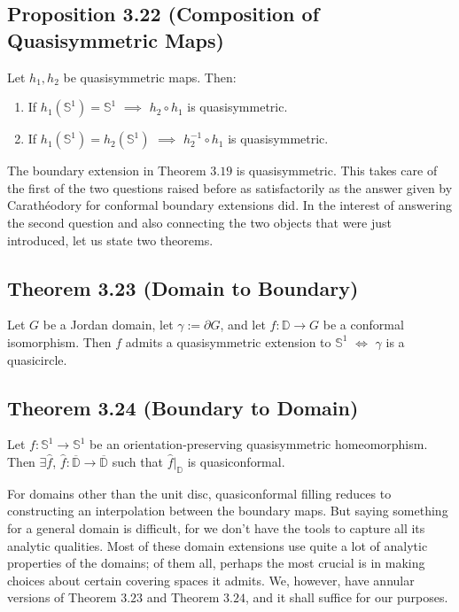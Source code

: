 \documentclass[11pt,a4paper]{article}
\begin{document}


        \subsection*{Proposition 3.22 (Composition of Quasisymmetric Maps)} Let $h_1, h_2$ be quasisymmetric maps. Then:
        \begin{enumerate}
            \item If $h_1(\mathbb{S}^1) = \mathbb{S}^1$ $\implies$ $h_2 \circ h_1$ is quasisymmetric.
            \item If $h_1(\mathbb{S}^1) = h_2(\mathbb{S}^1)$ $\implies$ $h_2^{-1}\circ h_1$ is quasisymmetric.
        \end{enumerate}




        The boundary extension in Theorem $3.19$ is quasisymmetric. This takes care of the first of the two questions raised before as satisfactorily as the answer given by Carath\'eodory for conformal boundary extensions did. In the interest of answering the second question and also connecting the two objects that were just introduced, let us state two theorems.

        \subsection*{Theorem 3.23 (Domain to Boundary)} Let $G$ be a Jordan domain, let $\gamma := \partial G$, and let $f: \mathbb{D} \rightarrow G$ be a conformal isomorphism. Then $f$ admits a quasisymmetric extension to $\mathbb{S}^1$ $\iff$ $\gamma$ is a quasicircle.



        \subsection*{Theorem 3.24 (Boundary to Domain)} Let $f:\mathbb{S}^1 \rightarrow \mathbb{S}^1$ be an orientation-preserving quasisymmetric homeomorphism. Then $\exists \hat{f}$, $\hat{f}: \overline{\mathbb{D}} \rightarrow \overline{\mathbb{D}}$ such that $\hat{f}\big|_{\mathbb{D}}$ is quasiconformal.




        For domains other than the unit disc, quasiconformal filling reduces to constructing an interpolation between the boundary maps. But saying something for a general domain is difficult, for we don't have the tools to capture all its analytic qualities. Most of these domain extensions use quite a lot of analytic properties of the domains; of them all, perhaps the most crucial is in making choices about certain covering spaces it admits. We, however, have annular versions of Theorem $3.23$ and Theorem $3.24$, and it shall suffice for our purposes.
\end{document}
